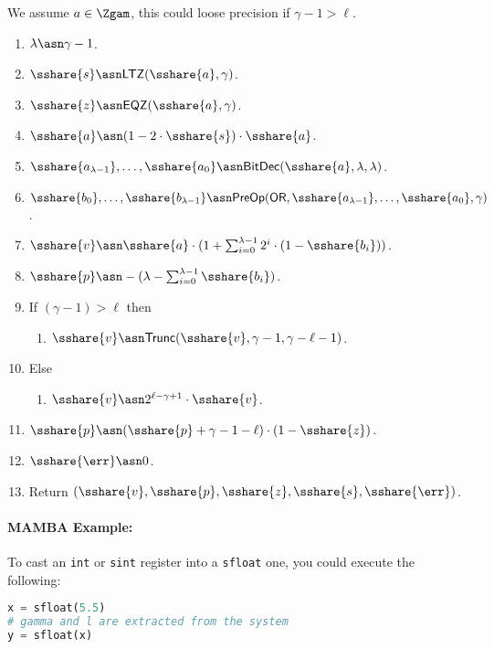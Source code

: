   We assume $a \in \Zgam$, this could loose precision if $\gamma-1>\ell$.
  \begin{enumerate}
    \item $\lambda \asn \gamma-1$.
    \item $\sshare{s} \asn \mathsf{LTZ}(\sshare{a},\gamma)$.
    \item $\sshare{z} \asn \mathsf{EQZ}(\sshare{a},\gamma)$.
    \item $\sshare{a} \asn (1- 2 \cdot \sshare{s}) \cdot \sshare{a}$.
    \item $\sshare{a_{\lambda-1}},\ldots,\sshare{a_0}
            \asn \mathsf{BitDec}(\sshare{a},\lambda,\lambda)$.
    \item $\sshare{b_0},\ldots,\sshare{b_{\lambda-1}} \asn
            \mathsf{PreOp}(\mathsf{OR},\sshare{a_{\lambda-1}},\ldots,\sshare{a_0},\gamma)$.
    \item $\sshare{v} \asn \sshare{a} \cdot
            ( 1+\sum_{i=0}^{\lambda-1} 2^i \cdot (1-\sshare{b_i}))$.
    \item $\sshare{p} \asn - (\lambda-\sum_{i=0}^{\lambda-1} \sshare{b_i})$.
    \item If $(\gamma-1)>\ell$ then
          \begin{enumerate}
            \item $\sshare{v} \asn \mathsf{Trunc}(\sshare{v},\gamma-1,\gamma-\ell-1)$.
          \end{enumerate}
    \item Else
          \begin{enumerate}
            \item $\sshare{v} \asn 2^{\ell-\gamma+1} \cdot \sshare{v}$.
          \end{enumerate}
    \item $\sshare{p} \asn (\sshare{p}+\gamma-1-\ell) \cdot (1-\sshare{z})$.
    \item $\sshare{\err} \asn 0$.
    \item Return $(\sshare{v},\sshare{p},\sshare{z},\sshare{s},\sshare{\err})$.
  \end{enumerate}

  \paragraph{MAMBA Example:} To cast an \verb|int| or \verb|sint| register into a \verb|sfloat| one, you could execute the following:
  \begin{lstlisting}[language={python}]
x = sfloat(5.5)
# gamma and l are extracted from the system
y = sfloat(x)
\end{lstlisting}


